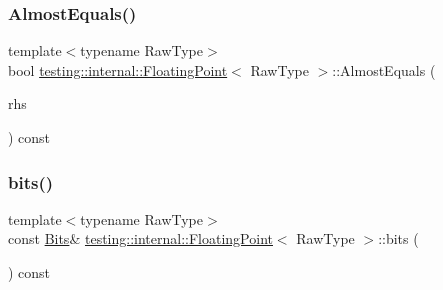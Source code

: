 \mbox{\label{classtesting_1_1internal_1_1_floating_point_a965214c1af2f9ac5adb1393794aa81e5}} 
\subsubsection{\texorpdfstring{AlmostEquals()}{AlmostEquals()}\hspace{0.1cm}{\footnotesize\ttfamily [3/3]}}
{\footnotesize\ttfamily template$<$typename Raw\+Type$>$ \\
bool \mbox{\hyperlink{classtesting_1_1internal_1_1_floating_point}{testing\+::internal\+::\+Floating\+Point}}$<$ Raw\+Type $>$\+::Almost\+Equals (\begin{DoxyParamCaption}\item[{const \mbox{\hyperlink{classtesting_1_1internal_1_1_floating_point}{Floating\+Point}}$<$ Raw\+Type $>$ \&}]{rhs }\end{DoxyParamCaption}) const\hspace{0.3cm}{\ttfamily [inline]}}

\mbox{\label{classtesting_1_1internal_1_1_floating_point_aab053be914bdc9e507c0db89740c318c}} 
\subsubsection{\texorpdfstring{bits()}{bits()}\hspace{0.1cm}{\footnotesize\ttfamily [1/3]}}
{\footnotesize\ttfamily template$<$typename Raw\+Type$>$ \\
const \mbox{\hyperlink{classtesting_1_1internal_1_1_floating_point_abf228bf6cd48f12c8b44c85b4971a731}{Bits}}\& \mbox{\hyperlink{classtesting_1_1internal_1_1_floating_point}{testing\+::internal\+::\+Floating\+Point}}$<$ Raw\+Type $>$\+::bits (\begin{DoxyParamCaption}{ }\end{DoxyParamCaption}) const\hspace{0.3cm}{\ttfamily [inline]}}

